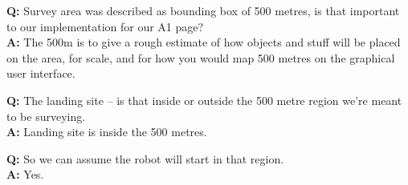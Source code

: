 \documentclass{article}
\newcounter{qcounter}
\begin{document}
\begin{list}{:~}{}
\item \textbf{Q:} Survey area was described as bounding box of 500 metres, is that important to our implementation for our A1 page?\\
\textbf{A:} The 500m is to give a rough estimate of how objects and stuff will be placed on the area, for scale, and for how you would map 500 metres on the graphical user interface.\\
\item \textbf{Q:} The landing site – is that inside or outside the 500 metre region we’re meant to be surveying.\\
\textbf{A:} Landing site is inside the 500 metres.\\
\item \textbf{Q:} So we can assume the robot will start in that region.\\
\textbf{A:} Yes.\\


\end{list}
\end{document}
